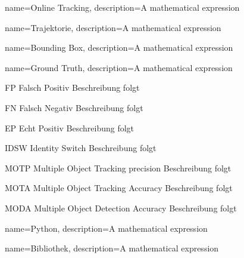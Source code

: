 {
        name=Online Tracking,
        description={A mathematical expression}
}

{
        name=Trajektorie,
        description={A mathematical expression}
}

{
        name=Bounding Box,
        description={A mathematical expression}
}

{
        name=Ground Truth,
        description={A mathematical expression}
}

\newglossaryentrywithacronym
{FP}
{Falsch Positiv}
{Beschreibung folgt}

\newglossaryentrywithacronym
{FN}
{Falsch Negativ}
{Beschreibung folgt}

\newglossaryentrywithacronym
{EP}
{Echt Positiv}
{Beschreibung folgt}

\newglossaryentrywithacronym
{IDSW}
{Identity Switch}
{Beschreibung folgt}

\newglossaryentrywithacronym
{MOTP}
{Multiple Object Tracking precision}
{Beschreibung folgt}

\newglossaryentrywithacronym
{MOTA}
{Multiple Object Tracking Accuracy}
{Beschreibung folgt}

\newglossaryentrywithacronym
{MODA}
{Multiple Object Detection Accuracy}
{Beschreibung folgt}


{
        name=Python,
        description={A mathematical expression}
}

{
        name=Bibliothek,
        description={A mathematical expression}
}







